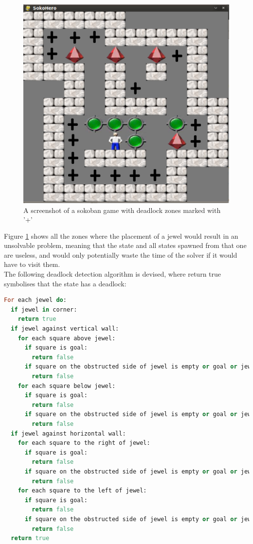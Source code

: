 \begin{figure}[ht]
\centering
\includegraphics[scale=0.25]{images/sokohero_deadlocks.eps}
\caption{A screenshot of a sokoban game with deadlock zones marked with '+'}
\label{fig:sokoherodeadlocks}
\end{figure}

Figure \ref{fig:sokoherodeadlocks} shows all the zones where the placement of a jewel would result in an unsolvable problem, meaning that the state and all states spawned from that one are useless, and would only potentially waste the time of the solver if it would have to visit them.
\\
The following deadlock detection algorithm is devised, where return true symbolises that the state has a deadlock:

\begin{lstlisting}[language=Ruby, frame=single, basicstyle=\small, caption={Deadlock detection pseudo code}, label={code:deaddetect}]
For each jewel do:
  if jewel in corner:
    return true
  if jewel against vertical wall:
    for each square above jewel:
      if square is goal:
        return false
      if square on the obstructed side of jewel is empty or goal or jewel:
        return false
    for each square below jewel:
      if square is goal:
        return false
      if square on the obstructed side of jewel is empty or goal or jewel:
        return false
  if jewel against horizontal wall:
    for each square to the right of jewel:
      if square is goal:
        return false
      if square on the obstructed side of jewel is empty or goal or jewel:
        return false
    for each square to the left of jewel:
      if square is goal:
        return false
      if square on the obstructed side of jewel is empty or goal or jewel:
        return false
  return true
\end{lstlisting}

